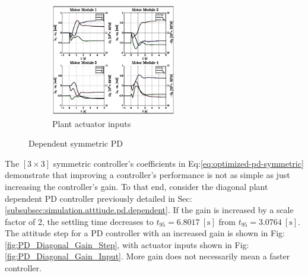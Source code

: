 \begin{figure}[htbp]
\begin{subfigure}{0.49\textwidth}
\end{subfigure}
\begin{subfigure}{\textwidth}
\centering
\includegraphics[width=0.6\textwidth]{graphs/PD_Diagonal_Dependent_Input}
\vspace{-8pt}
\caption{Plant actuator inputs}
\label{fig:PD_3x3_Dependent_Input}
\end{subfigure}
\vspace{-8pt}
\caption{Dependent symmetric PD}
\vspace{-26pt}
\end{figure}
\par
The $[3\times 3]$ symmetric controller's coefficients in Eq:\ref{eq:optimized-pd-symmetric} demonstrate that improving a controller's performance is not as simple as just increasing the controller's gain. To that end, consider the diagonal plant dependent PD controller previously detailed in Sec:\ref{subsubsec:simulation.atttiude.pd.dependent}. If the gain is increased by a scale factor of 2, the settling time decreases to $t_{95}=6.8017~[\text{s}]$ from $t_{95}=3.0764~[\text{s}]$. The attitude step for a PD controller with an increased gain is shown in Fig:\ref{fig:PD_Diagonal_Gain_Step}, with actuator inputs shown in Fig:\ref{fig:PD_Diagonal_Gain_Input}. More gain does not necessarily mean a faster controller.
